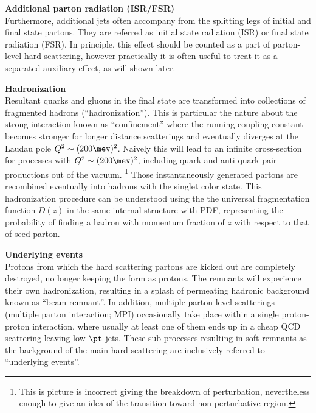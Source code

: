 \begin{description}
\item \textbf{Additional parton radiation (ISR/FSR)} \mbox{} \\
Furthermore, additional jets often accompany from the splitting legs of initial and final state partons. 
They are referred as initial state radiation (ISR) or final state radiation (FSR). 
In principle, this effect should be counted as a part of parton-level hard scattering, 
however practically it is often useful to treat it as a separated auxiliary effect, as will shown later. 
\\


\item \textbf{Hadronization} \mbox{} \\
Resultant quarks and gluons in the final state are transformed into collections of fragmented hadrons  (``hadronization'').
This is particular the nature about the strong interaction known as ``confinement'' where the running coupling constant becomes stronger for longer distance scatterings and eventually diverges at the Laudau pole $Q^2\sim (200\mev)^2$. Naively this will lead to an infinite cross-section for processes with $Q^2\sim (200\mev)^2$, including quark and anti-quark pair productions out of the vacuum. 
\footnote{This is picture is incorrect giving the breakdown of perturbation, nevertheless enough to give an idea of the transition toward non-perturbative region.}
Those instantaneously generated partons are recombined eventually into hadrons with the singlet color state. This hadronization procedure can be understood using the the universal fragmentation function $D(z)$ in the same internal structure with PDF, representing the probability of finding a hadron with momentum fraction of $z$ with respect to that of seed parton. \\


\item \textbf{Underlying events} \mbox{} \\
Protons from which the hard scattering partons are kicked out are completely destroyed, no longer keeping the form as protons.
The remnants will experience their own hadronization, resulting in a splash of permeating hadronic background known as ``beam remnant''.
In addition, multiple parton-level scatterings (multiple parton interaction; MPI) occasionally take place within a single proton-proton interaction, where usually at least one of them ends up in a cheap QCD scattering leaving low-$\pt$ jets.
These sub-processes resulting in soft remnants as the background of the main hard scattering are inclusively referred to ``underlying events''. \\
\end{description}

